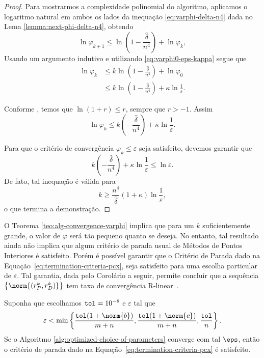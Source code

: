 \begin{proof} Para mostrarmos a complexidade polinomial do algoritmo, aplicamos o logaritmo natural em ambos os lados da inequação \eqref{eq:varphi-delta-n4} dada no Lema \ref{lemma:next-phi-delta-n4}, obtendo
	\[
	\ln\varphi_{k+1}\leq \ln \left(1 - \frac{\hat{\delta}}{n^{4}}\right) + \ln\varphi_{k},
	\]
Usando um argumento indutivo e utilizando \eqref{eq:varphi0-eps-kappa} segue que
\[
	\begin{aligned}
		\ln\varphi_{k} & \leq k \ln\left(1 - \frac{\hat{\delta}}{n^{4}}\right) + \ln \varphi_{0} \\
					& \leq k \ln\left(1 - \frac{\hat{\delta}}{n^{4}}\right) + \kappa\ln \frac{1}{\varepsilon}. 
	\end{aligned}
\] 

Conforme \textcite[Lema 4.1, p.~68]{Wright:Primal-dual-interior-point:1997h}, temos que $\ln(1+r) \leq r$, sempre que $r>-1$. Assim
\[
	\ln\varphi_{k}\leq k \left(- \frac{\hat{\delta}}{n^{4}}\right) + \kappa\ln \frac{1}{\varepsilon}.
\] 

Para que o critério de convergência $\varphi_{k}\leq\varepsilon$ seja satisfeito, devemos garantir que 
\[
	k \left(- \frac{\hat{\delta}}{n^{4}}\right) + \kappa\ln \frac{1}{\varepsilon} \leq \ln\varepsilon.
\] 
De fato, tal inequação é válida para 
\[
	k \geq \dfrac{n^{4}}{\hat{\delta}}(1+\kappa)\ln\frac{1}{\varepsilon},
\]
o que termina a demonstração.
\end{proof}






O Teorema \ref{teo:alg-convergence-varphi} implica que para um $k$ suficientemente grande, o valor de $\varphi$ será tão pequeno quanto se deseja. No entanto, tal resultado ainda não implica que algum critério de parada usual de Métodos de Pontos Interiores é satisfeito. Porém é possível garantir que o Critério de Parada dado na Equação~\eqref{eq:termination-criteria-pcx}, seja satisfeito para uma escolha particular de $\varepsilon$. Tal garantia, dada pelo Corolário a seguir, permite concluir que a sequência $\left\{\norm{(r_{P}^{k},r_{D}^{k})}\right\}$ tem taxa de convergência R-linear~\cite{Ortega:2000vd}.

\begin{corol}
Suponha que escolhamos  $\mathtt{tol} = \num{e-8}$  e $\varepsilon$   tal que 
\begin{equation}
	\label{eq:choosing-eps}
		\varepsilon < \min\left\{  \frac{\tol(1+\norm{b})}{m+n}, \frac{\tol(1+\norm{c})}{m+n},\frac{\tol}{n}\right\}.
\end{equation}
Se o Algoritmo \ref{alg:optimized-choice-of-parameters} converge com tal $\eps$, então o critério de parada dado na Equação~\eqref{eq:termination-criteria-pcx} é satisfeito.
\end{corol}		

